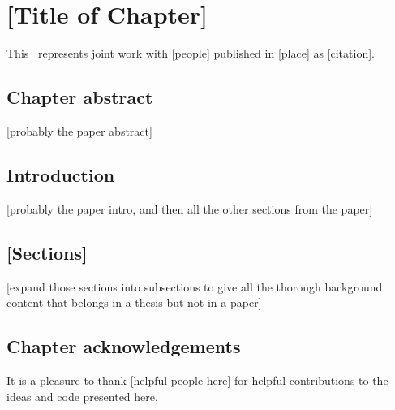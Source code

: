 \renewcommand{\chapid}{chapter}

\newcommand{\thisplain}{[insert repo name]}
\newcommand{\this}{\project{\thisplain}}
\newcommand{\license}{MIT License}
\newcommand{\Python}{\project{Python}}
\newcommand{\numpy}{\project{numpy}}
\newcommand{\Ubuntu}{\project{Ubuntu}}
\newcommand{\github}{\project{GitHub}}
\newcommand{\pip}{\project{pip}}
\newcommand{\acor}{\project{acor}}

\newcommand{\model}{\ensuremath{\vector{\Theta}}}
\newcommand{\data}{\ensuremath{\vector{D}}}
\newcommand{\nuisance}{\ensuremath{\vector{\alpha}}}
\newcommand{\link}{\ensuremath{X}}
\newcommand{\ensemble}{S}
\newcommand{\colorens}[1]{\ensemble^{(#1)}}
\newcommand{\red}{\colorens{0}}
\newcommand{\blue}{\colorens{1}}
\renewcommand{\vector}[1]{#1}
\renewcommand{\matrix}[1]{#1}

\chapter{[Title of Chapter]}

This \paper\ represents joint work with [people] published in [place] as [citation].

\section{Chapter abstract}

[probably the paper abstract]

\section{Introduction}

[probably the paper intro, and then all the other sections from the paper]

\section{[Sections]}

[expand those sections into subsections to give all the thorough background content that belongs in a thesis but not in a paper]

\section{Chapter acknowledgements}

It is a pleasure to thank
[helpful people here]
for helpful contributions to the ideas and code presented here.
